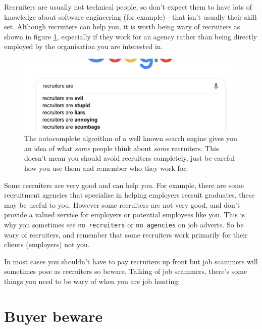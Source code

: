 \documentclass[
]{book}
\begin{document}
Recruiters are usually not technical people, so don't expect them to have lots of knowledge about software engineering (for example) - that isn't usually their skill set. Although recruiters can help you, it is worth being wary of recruiters as shown in figure \ref{fig:recruiter-fig}, especially if they work for an agency rather than being directly employed by the organisation you are interested in.

\begin{figure}

{\centering \includegraphics[width=0.9\linewidth]{images/recruiters-are} 

}

\caption{The autocomplete algorithm of a well known search engine gives you an idea of what \emph{some} people think about \emph{some} recruiters. This doesn't mean you should avoid recruiters completely, just be careful how you use them and remember who they work for.}\label{fig:recruiter-fig}
\end{figure}



Some recruiters are very good and can help you. For example, there are some recruitment agencies that specialise in helping employers recruit graduates, these may be useful to you. However some recruiters are not very good, and don't provide a valued service for employers or potential employees like you. This is why you sometimes see \texttt{no\ recruiters} or \texttt{no\ agencies} on job adverts. So be wary of recruiters, and remember that some recruiters work primarily for their clients (employers) not you.

In most cases you shouldn't have to pay recruiters up front but job scammers will sometimes pose as recruiters so beware. Talking of job scammers, there's some things you need to be wary of when you are job hunting:

\hypertarget{beware}{%
\section{Buyer beware}\label{beware}}
\end{document}
